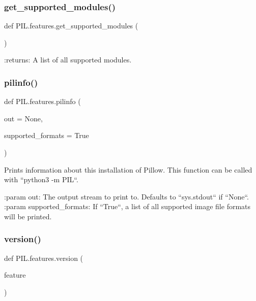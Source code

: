 \subsubsection{\texorpdfstring{get\+\_\+supported\+\_\+modules()}{get\_supported\_modules()}}
{\footnotesize\ttfamily def P\+I\+L.\+features.\+get\+\_\+supported\+\_\+modules (\begin{DoxyParamCaption}{ }\end{DoxyParamCaption})}

\begin{DoxyVerb}:returns: A list of all supported modules.
\end{DoxyVerb}
 \mbox{\label{namespacePIL_1_1features_aa8419d7f72fa0bf7f764d8d7dba19443}} 
\subsubsection{\texorpdfstring{pilinfo()}{pilinfo()}}
{\footnotesize\ttfamily def P\+I\+L.\+features.\+pilinfo (\begin{DoxyParamCaption}\item[{}]{out = {\ttfamily None},  }\item[{}]{supported\+\_\+formats = {\ttfamily True} }\end{DoxyParamCaption})}

\begin{DoxyVerb}Prints information about this installation of Pillow.
This function can be called with ``python3 -m PIL``.

:param out:
    The output stream to print to. Defaults to ``sys.stdout`` if ``None``.
:param supported_formats:
    If ``True``, a list of all supported image file formats will be printed.
\end{DoxyVerb}
 \mbox{\label{namespacePIL_1_1features_aa4315ad39e502ab0c7d72dc1055e53a8}} 
\subsubsection{\texorpdfstring{version()}{version()}}
{\footnotesize\ttfamily def P\+I\+L.\+features.\+version (\begin{DoxyParamCaption}\item[{}]{feature }\end{DoxyParamCaption})}

